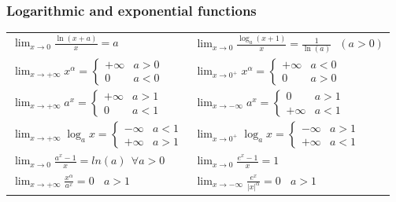 \subsubsection{Logarithmic and exponential functions}
\begin{tabularx}{\textwidth}{ X X }
	
$ \displaystyle \lim_{x\rightarrow0}\frac{\ln(x+a)}{x}=a $ &
$ \displaystyle \lim_{x\rightarrow0}\frac{\log_a(x+1)}{x}=\frac{1}{\ln(a)} ~~~ (a>0) $ \\ [2ex]

$ \displaystyle \lim_{x\rightarrow+\infty}x^\alpha= \begin{cases}
+\infty & a>0 \\
0 & a<0
\end{cases} $ & 
$ \displaystyle \lim_{x\rightarrow0^+}x^\alpha= \begin{cases}
+\infty & a<0 \\
0 & a>0
\end{cases} $ \\ [2.2ex]

$ \displaystyle \lim_{x\rightarrow+\infty}a^x= \begin{cases}
+\infty & a>1 \\
0 & a<1
\end{cases} $ & 
$ \displaystyle \lim_{x\rightarrow-\infty}a^x= \begin{cases}
0 & a>1 \\
+\infty & a<1 
\end{cases} $ \\ [2.2ex]

$ \displaystyle \lim_{x\rightarrow+\infty}\log_ax= \begin{cases}
-\infty & a<1 \\
+\infty & a>1 
\end{cases} $ & 
$ \displaystyle \lim_{x\rightarrow 0^+}\log_ax= \begin{cases}
-\infty & a>1 \\
+\infty & a<1 
\end{cases} $ \\ [2.2ex]

$ \displaystyle\lim_{x\rightarrow0}\frac{a^x-1}{x}=ln(a) ~~ \forall a>0 $ &
 $ \displaystyle \lim_{x\rightarrow0}\frac{e^x-1}{x}=1 $ \\[2ex]

$ \displaystyle \lim_{x\rightarrow+\infty}\frac{x^\alpha}{a^x}=0  ~~~~ a>1 $ &
$ \displaystyle \lim_{x\rightarrow-\infty}\frac{e^x}{\left|x\right|^\alpha}=0 ~~~~ a>1 $ \\ [2ex]


\end{tabularx}
